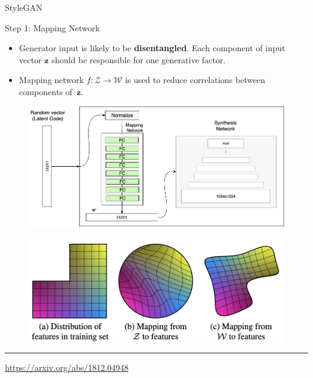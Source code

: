 \documentclass{beamer}
\newcommand{\bz}{\mathbf{z}}
\newcommand{\cW}{\mathcal{W}}
\newcommand{\cZ}{\mathcal{Z}}
\begin{document}
\begin{frame}{StyleGAN}
	\begin{block}{Step 1: Mapping Network}
		\begin{itemize}
			\item Generator input is likely to be \textbf{disentangled}.  Each component of input vector $\bz$ should be responsible for one generative factor.
			\item Mapping network $f: \cZ \rightarrow \cW$ is used to reduce correlations between components of~$\bz$.
		\end{itemize}
		\begin{minipage}[t]{0.6\columnwidth}
			\begin{figure}
				\centering
				\includegraphics[width=0.98\linewidth]{figs/stylegan_mapping}
			\end{figure}
		\end{minipage}%
		\begin{minipage}[t]{0.38\columnwidth}
			\begin{figure}
				\centering
				\includegraphics[width=1.0\linewidth]{figs/stylegan_curved}
			\end{figure}
		\end{minipage}
	\vspace{0.3cm}
	\end{block}
	\vfill
	\hrule\medskip 
	{\scriptsize \href{https://arxiv.org/abs/1812.04948}{https://arxiv.org/abs/1812.04948}}
\end{frame}
\end{document}
